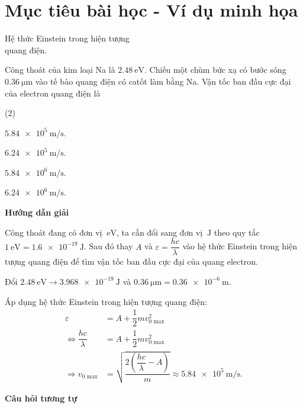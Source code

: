 \section{Mục tiêu bài học - Ví dụ minh họa}

\begin{dang}{Hệ thức Einstein trong hiện tượng\\ quang điện.}
	
	
	{Công thoát của kim loại Na là $\SI{2.48}{\electronvolt}$. Chiếu một chùm bức xạ có bước sóng $\SI{0.36}{\micro \meter}$ vào tế bào quang điện có catốt làm bằng Na. Vận tốc ban đầu cực đại của electron quang điện là
		\begin{mcq}(2)
			\item $\SI{5.84e5}{\meter / \second}$.
			\item $\SI{6.24e5}{\meter / \second}$.
			\item $\SI{5.84e6}{\meter / \second}$.
			\item $\SI{6.24e6}{\meter / \second}$.
		\end{mcq}
	}
	{\begin{center}
			\textbf{Hướng dẫn giải}
		\end{center}
		
		Công thoát đang có đơn vị $\SI{}{\electronvolt}$, ta cần đổi sang đơn vị $\SI{}{\joule}$ theo quy tắc $\SI{1}{\electronvolt} = \SI{1.6e-19}{\joule}$. Sau đó thay $A$ và $\varepsilon = \dfrac{hc}{\lambda}$ vào hệ thức Einstein trong hiện tượng quang điện để tìm vận tốc ban đầu cực đại của quang electron.
		
		Đổi $\SI{2.48}{\electronvolt}\rightarrow \SI{3.968e-19}{\joule}$ và $\SI{0.36}{\micro \meter} = \SI{0.36e-6}{\meter}$.
		
		Áp dụng hệ thức Einstein trong hiện tượng quang điện:
		\begin{align*}
			\varepsilon &= A + \dfrac{1}{2}mv_{\text{0 max}}^2 \\
			\Leftrightarrow \dfrac{hc}{\lambda} &= A+\dfrac{1}{2}mv_{\text{0 max}}^2 \\
			\Rightarrow v_{\text{0 max}} &= \sqrt {\dfrac{2\left(\dfrac{hc}{\lambda}-A\right)}{m}} \approx \SI{5.84e5}{\meter / \second}.
		\end{align*}
		
		\begin{center}
			\textbf{Câu hỏi tương tự}
		\end{center}
		
}
\end{dang}
